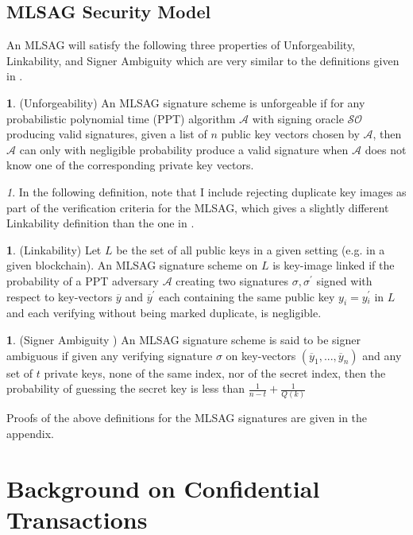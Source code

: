 \documentclass[12pt,oneside,english]{amsart}
\numberwithin{equation}{section}
\numberwithin{figure}{section}
\theoremstyle{plain}
\theoremstyle{plain}
\theoremstyle{remark}
\newtheorem{rem}[thm]{\protect\remarkname}
\theoremstyle{plain}
\theoremstyle{remark}
\theoremstyle{remark}
\theoremstyle{plain}
\theoremstyle{definition}
\newtheorem{defn}[thm]{\protect\definitionname}
\providecommand{\definitionname}{Definition}
\providecommand{\remarkname}{Remark}
\begin{document}
\subsection{MLSAG Security Model}

An MLSAG will satisfy the following three properties of Unforgeability,
Linkability, and Signer Ambiguity which are very similar to the definitions
given in \cite{LWW}. 
\begin{defn}
\label{def:(Unforgeability)--An}(Unforgeability) %
{} An MLSAG signature scheme is unforgeable if for any probabilistic polynomial time (PPT) algorithm
$\mathcal{A}$ with signing oracle $\mathcal{SO}$ producing valid
signatures, given a list of $n$ public key vectors chosen by $\mathcal{A}$,
then $\mathcal{A}$ can only with negligible probability produce a
valid signature when $\mathcal{A}$ does not know one of the corresponding
private key vectors. 
\end{defn}
\begin{rem}
In the following definition, note that I include rejecting duplicate
key images as part of the verification criteria for the MLSAG, which gives a slightly different Linkability definition than the one in \cite{LWW}. 
\end{rem}
\begin{defn}
\label{def:(Linkability)}(Linkability) Let $L$ be the set of all
public keys in a given setting (e.g. in a given blockchain). An MLSAG signature scheme on $L$ is key-image
linked if the probability of a PPT adversary $\mathcal{A}$ creating
two signatures $\sigma,\sigma^{\prime}$ signed with respect to key-vectors
$\overline{y}$ and $\overline{y}^{\prime}$ each containing the same
public key $y_{i}=y$$_{i}^{\prime}$ in $L$ and each verifying without being marked duplicate,
is negligible. %
\end{defn}
\begin{defn}
\label{def:(Signer-Ambiguity-)}(Signer Ambiguity %
) An MLSAG signature scheme is said to be signer ambiguous if given
any verifying signature $\sigma$ on key-vectors $\left(\overline{y}_{1},...,\overline{y}_{n}\right)$
and any set of $t$ private keys, none of the same index, nor of the
secret index, then the probability of guessing the secret key is less
than $\frac{1}{n-t}+\frac{1}{Q\left(k\right)}$ 
\end{defn}
Proofs of the above definitions for the MLSAG signatures are given in the appendix. 

\section{\label{sec:Background-on-ConfidentialT}Background on Confidential
Transactions}
\end{document}
